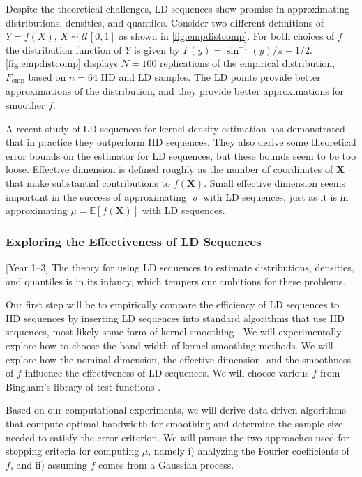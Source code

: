 \documentclass[11pt]{NSFamsart}
\newcommand{\bbE}{\mathbb{E}}
\newcommand{\bX}{{\boldsymbol{X}}}
\newcommand{\calu}{{\mathcal{U}}}
\begin{document}
Despite the theoretical challenges, LD sequences show promise in approximating distributions, densities, and quantiles.  Consider two different definitions of $Y = f(X)$, $X \sim \calu[0,1]$ as shown in \cref{fig:empdistcomp}.  For both choices of $f$ the distribution function of $Y$ is given by $F(y) = \sin^{-1}(y)/\pi + 1/2$.  \cref{fig:empdistcomp} displays $N = 100$ replications of the empirical distribution, $F_{\mathrm{emp}}$ based on $n=64$ IID and LD samples.  The  LD points provide better approximations of the distribution, and they provide better approximations for smoother $f$.

A recent study of LD sequences for kernel density estimation \cite{AbdEtal21a} has demonstrated that in practice they outperform IID sequences.  They also derive some theoretical error bounds on the estimator for LD sequences, but these bounds seem to be too loose.  Effective dimension is defined roughly as the number of coordinates of $\bX$ that make substantial contributions to $f(\bX)$.  Small effective dimension seems important in the success of approximating  $\varrho$ with LD sequences, just as it is in approximating  $\mu = \bbE[f(\bX)]$ with LD sequences.

\subsubsection{Exploring the Effectiveness of LD Sequences}[Year 1--3] The theory for using LD sequences to estimate distributions, densities, and quantiles is in its infancy, which tempers our ambitions for these problems.  

Our first step will be to empirically compare the efficiency of LD sequences to IID sequences by inserting LD sequences into standard algorithms that use IID sequences, most likely some form of kernel smoothing \cite{WanJon95a}.  We will experimentally explore how to choose the band-width of kernel smoothing methods.  We will explore how the nominal dimension, the effective dimension, and the smoothness of $f$ influence the effectiveness of LD sequences.  We will choose various $f$ from Bingham's library of test functions \cite{VirLib17a}.

Based on  our computational experiments, we will derive data-driven algorithms that compute optimal bandwidth for smoothing and determine the sample size needed to satisfy the error criterion.  We will pursue the two approaches used for stopping criteria for computing $\mu$, namely i) analyzing the Fourier coefficients of $f$, and ii) assuming $f$ comes from a Gaussian process.
\end{document}

